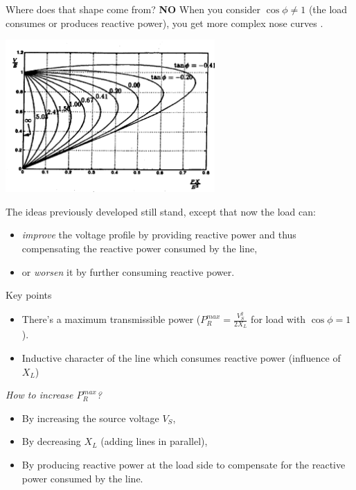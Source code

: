 \begin{frame}[allowframebreaks]{Where does that shape come from?}
\textbf{NO}
When you consider $\cos \phi \neq 1$ (the load consumes or produces reactive power), you get more complex nose curves \cite{van2007voltage}.
\begin{center}
\includegraphics[width=0.6\textwidth]{images/TrueNoseCurve.png}
\end{center}
The ideas previously developed still stand, except that now the load can:
\begin{itemize}
    \item \emph{improve} the voltage profile by providing reactive power and thus compensating the reactive power consumed by the line,
    \item or \emph{worsen} it by further consuming reactive power.
\end{itemize}
\end{frame}

\begin{frame}{Key points}
\begin{itemize}
    \item There's a maximum transmissible power ($P_{R}^{max} = \frac{V_S^2}{2 X_L}$ for load with $\cos \phi = 1$).
    \item Inductive character of the line which consumes reactive power (influence of $X_L$)
\end{itemize}
\emph{How to increase $P_{R}^{max}$?}
\begin{itemize}
    \item By increasing the source voltage $V_S$,
    \item By decreasing $X_L$ (adding lines in parallel),
    \item By producing reactive power at the load side to compensate for the reactive power consumed by the line.
\end{itemize}
\end{frame}

